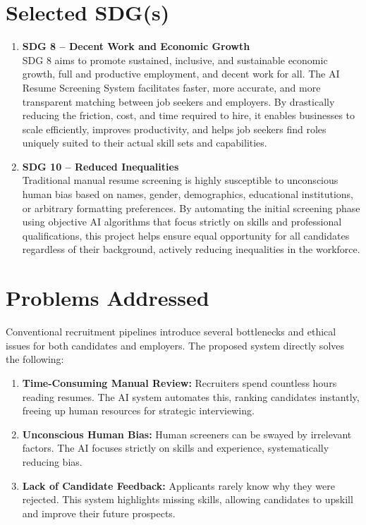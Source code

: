 \documentclass[12pt,a4paper]{report}
\begin{document}
\section{Selected SDG(s)}
\begin{enumerate}
\item\textbf{SDG 8 – Decent Work and Economic Growth}\\
SDG 8 aims to promote sustained, inclusive, and sustainable economic growth, full and productive employment, and decent work for all. The AI Resume Screening System facilitates faster, more accurate, and more transparent matching between job seekers and employers. By drastically reducing the friction, cost, and time required to hire, it enables businesses to scale efficiently, improves productivity, and helps job seekers find roles uniquely suited to their actual skill sets and capabilities.

\item\textbf{SDG 10 – Reduced Inequalities}\\
Traditional manual resume screening is highly susceptible to unconscious human bias based on names, gender, demographics, educational institutions, or arbitrary formatting preferences. By automating the initial screening phase using objective AI algorithms that focus strictly on skills and professional qualifications, this project helps ensure equal opportunity for all candidates regardless of their background, actively reducing inequalities in the workforce.
\end{enumerate}

\section{Problems Addressed}
Conventional recruitment pipelines introduce several bottlenecks and ethical issues for both candidates and employers. The proposed system directly solves the following:
\begin{enumerate}
\item \textbf{Time-Consuming Manual Review:} Recruiters spend countless hours reading resumes. The AI system automates this, ranking candidates instantly, freeing up human resources for strategic interviewing.
\item \textbf{Unconscious Human Bias:} Human screeners can be swayed by irrelevant factors. The AI focuses strictly on skills and experience, systematically reducing bias.
\item \textbf{Lack of Candidate Feedback:} Applicants rarely know why they were rejected. This system highlights missing skills, allowing candidates to upskill and improve their future prospects.
\end{enumerate}
\end{document}
